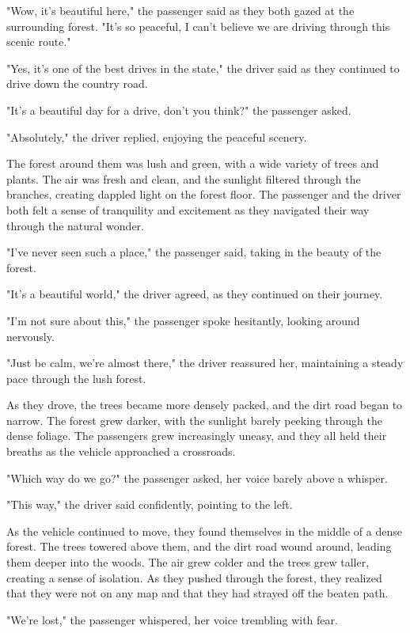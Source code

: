 \documentclass[smalldemyvopaper,11pt,twoside,onecolumn,openright,extrafontsizes]{memoir}
\begin{document}
"Wow, it's beautiful here," the passenger said as they both gazed at the surrounding forest. "It's so peaceful, I can't believe we are driving through this scenic route."\par
"Yes, it's one of the best drives in the state," the driver said as they continued to drive down the country road.\par
"It's a beautiful day for a drive, don't you think?" the passenger asked.\par
"Absolutely," the driver replied, enjoying the peaceful scenery.\par
The forest around them was lush and green, with a wide variety of trees and plants. The air was fresh and clean, and the sunlight filtered through the branches, creating dappled light on the forest floor. The passenger and the driver both felt a sense of tranquility and excitement as they navigated their way through the natural wonder.\par
"I've never seen such a place," the passenger said, taking in the beauty of the forest.\par
"It's a beautiful world," the driver agreed, as they continued on their journey.\par
"I'm not sure about this," the passenger spoke hesitantly, looking around nervously.\par
"Just be calm, we're almost there," the driver reassured her, maintaining a steady pace through the lush forest.\par
As they drove, the trees became more densely packed, and the dirt road began to narrow. The forest grew darker, with the sunlight barely peeking through the dense foliage. The passengers grew increasingly uneasy, and they all held their breaths as the vehicle approached a crossroads.\par
"Which way do we go?" the passenger asked, her voice barely above a whisper.\par
"This way," the driver said confidently, pointing to the left.\par
As the vehicle continued to move, they found themselves in the middle of a dense forest. The trees towered above them, and the dirt road wound around, leading them deeper into the woods. The air grew colder and the trees grew taller, creating a sense of isolation. As they pushed through the forest, they realized that they were not on any map and that they had strayed off the beaten path.\par
"We're lost," the passenger whispered, her voice trembling with fear.\par
\end{document}
